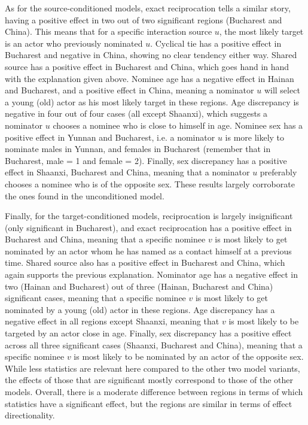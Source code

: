As for the source-conditioned models, exact reciprocation tells a similar story, having a positive effect in two out of two significant regions (Bucharest and China). This means that for a specific interaction source $u$, the most likely target is an actor who previously nominated $u$. Cyclical tie has a positive effect in Bucharest and negative in China, showing no clear tendency either way. Shared source has a positive effect in Bucharest and China, which goes hand in hand with the explanation given above. Nominee age has a negative effect in Hainan and Bucharest, and a positive effect in China, meaning a nominator $u$ will select a young (old) actor as his most likely target in these regions. Age discrepancy is negative in four out of four cases (all except Shaanxi), which suggests a nominator $u$ chooses a nominee who is close to himself in age. Nominee sex has a positive effect in Yunnan and Bucharest, i.e. a nominator $u$ is more likely to nominate males in Yunnan, and females in Bucharest (remember that in Bucharest, male = 1 and female = 2). Finally, sex discrepancy has a positive effect in Shaanxi, Bucharest and China, meaning that a nominator $u$ preferably chooses a nominee who is of the opposite sex. These results largely corroborate the ones found in the unconditioned model.

Finally, for the target-conditioned models, reciprocation is largely insignificant (only significant in Bucharest), and exact reciprocation has a positive effect in Bucharest and China, meaning that a specific nominee $v$ is most likely to get nominated by an actor whom he has named as a contact himself at a previous time. Shared source also has a positive effect in Bucharest and China, which again supports the previous explanation. Nominator age has a negative effect in two (Hainan and Bucharest) out of three (Hainan, Bucharest and China) significant cases, meaning that a specific nominee $v$ is most likely to get nominated by a young (old) actor in these regions. Age discrepancy has a negative effect in all regions except Shaanxi, meaning that $v$ is most likely to be targeted by an actor close in age. Finally, sex discrepancy has a positive effect across all three significant cases (Shaanxi, Bucharest and China), meaning that a specific nominee $v$ is most likely to be nominated by an actor of the opposite sex. While less statistics are relevant here compared to the other two model variants, the effects of those that are significant mostly correspond to those of the other models. Overall, there is a moderate difference between regions in terms of which statistics have a significant effect, but the regions are similar in terms of effect directionality.

